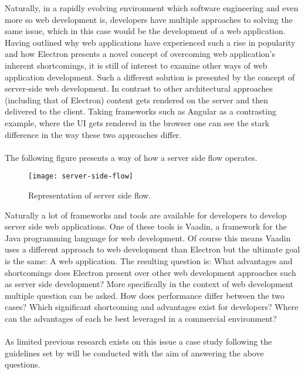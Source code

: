 
Naturally, in a rapidly evolving environment which software engineering and even more so 
web development is, developers have multiple approaches to solving the same issue, which 
in this case would be the development of a web application.
Having outlined why web applications have experienced such a rise in popularity and how
Electron presents a novel concept of overcoming web application's inherent shortcomings, 
it is still of interest to examine other ways of web application development.
Such a different solution is presented by the concept of server-side web development.
In contrast to other architectural approaches (including that of Electron) content 
gets rendered on the server and then delivered to the client. 
Taking frameworks such as Angular as a contrasting example, where the UI gets rendered in 
the browser one can see the stark difference in the way these two approaches differ. \paragraph{}
The following figure presents a way of how a server side flow operates.
\begin{figure}[ht]
    \texttt{[image: server-side-flow]}
    \caption{Representation of server side flow. \parencite{taufan2020}}
    \label{fig:server-side-flow}
\end{figure}
Naturally a lot of frameworks and tools are available for developers to develop server side
web applications.
One of these tools is Vaadin, a framework for the Java programming language for web development. \parencite{vaadinDocs}
Of course this means Vaadin uses a different approach to web development than Electron 
but the ultimate goal is the same: A web application.
The resulting question is: What advantages and shortcomings does Electron present over other web
development approaches such as server side development?
More specifically in the context of web development multiple question can be asked.
How does performance differ between the two cases? 
Which significant shortcoming and advantages exist for developers?
Where can the advantages of each be best leveraged in a commercial environment? \paragraph{}
As limited previous research exists on this issue a case study following the guidelines 
set by \textcite{caseStudy} will be conducted with the aim of answering the above questions. 
